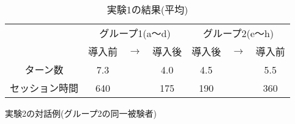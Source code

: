 \begin{table}[htp]
\caption{実験1の結果(平均)}\label{tab:mtexam1}
\centering \bigskip
\begin{tabular}{c|ccc|ccc}
\hline \hline
&\multicolumn{3}{c|}{グループ1(a〜d)} &
\multicolumn{3}{c}{グループ2(e〜h)}\\
& 導入前 & $\rightarrow$ & 導入後 &
導入後 & $\rightarrow$ & 導入前\\ \hline
ターン数 & 7.3 & & 4.0 & 4.5 & & 5.5\\
セッション時間 & 640 & & 175 & 190 & & 360\\
\hline \hline
\end{tabular}
\end{table}

\begin{table}[htp] 
\caption{実験2の対話例(グループ2の同一被験者)}\label{tab:ex1ex}
\bigskip\centering\footnotesize\tt


\end{table}
